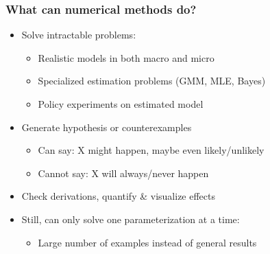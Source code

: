 \documentclass[bigger]{beamer}
\begin{document}
\begin{frame}%

\frametitle{What can numerical methods do?}

\begin{itemize}
\item Solve intractable problems:

\begin{itemize}
\item Realistic models in both macro and micro

\item Specialized estimation problems (GMM, MLE, Bayes)

\item Policy experiments on estimated model
\end{itemize}

\item Generate hypothesis or counterexamples

\begin{itemize}
\item Can say: X might happen, maybe even likely/unlikely

\item Cannot say: X will always/never happen
\end{itemize}

\item Check derivations, quantify \& visualize effects

\item Still, can only solve one parameterization at a time:

\begin{itemize}
\item Large number of examples instead of general results
\end{itemize}
\end{itemize}


\end{frame}%
\end{document}
